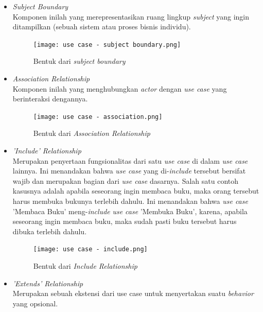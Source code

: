 \documentclass[a4paper]{article}
\begin{document}
\begin{enumerate}
\begin{itemize}
        \item \textit{Subject Boundary}\\
        Komponen inilah yang merepresentasikan ruang lingkup \textit{subject} yang ingin ditampilkan (sebuah sistem atau proses bisnis individu)\autocite{systemanalysisdesign-use-case-diagram}.
        \begin{figure}[h]
            \centering
            \texttt{[image: use case - subject boundary.png]}
            \caption{Bentuk dari \textit{subject boundary}}
        \end{figure}
        \newpage
        \item \textit{Association Relationship}\\
        Komponen inilah yang menghubungkan \textit{actor} dengan \textit{use case} yang berinteraksi dengannya\autocite{systemanalysisdesign-use-case-diagram}.
        \begin{figure}[h]
            \centering
            \texttt{[image: use case - association.png]}
            \caption{Bentuk dari \textit{Association Relationship}}
        \end{figure}
        \item \textit{'Include' Relationship}\\
        Merupakan penyertaan fungsionalitas dari satu \textit{use case} di dalam \textit{use case} lainnya\autocite{systemanalysisdesign-use-case-diagram}. Ini menandakan bahwa \textit{use case} yang di-\textit{include}  tersebut bersifat wajib dan merupakan bagian dari \textit{use case} dasarnya. Salah satu contoh kasusnya adalah apabila seseorang ingin membaca buku, maka orang tersebut harus membuka bukunya terlebih dahulu. Ini menandakan bahwa \textit{use case} 'Membaca Buku' meng-\textit{include} \textit{use case} 'Membuka Buku', karena, apabila seseorang ingin membaca buku, maka sudah pasti buku tersebut harus dibuka terlebih dahulu\autocite{educativeio-include-extend-usecase}.
        \begin{figure}[h]
            \centering
            \texttt{[image: use case - include.png]}
            \caption{Bentuk dari \textit{Include Relationship}}
        \end{figure}
        \newpage
        \item \textit{'Extends' Relationship}\\
        Merupakan sebuah ekstensi dari use case untuk menyertakan suatu \textit{behavior} yang opsional\autocite{systemanalysisdesign-use-case-diagram}.
        \begin{figure}[h]

\end{figure}
\end{itemize}
\end{enumerate}
\end{document}
